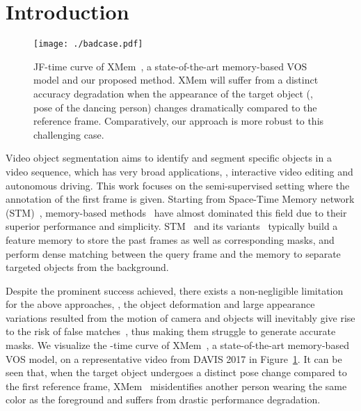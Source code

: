 \documentclass[10pt,twocolumn,letterpaper]{article}
\begin{document}
\section{Introduction}
\label{sec:intro}
\begin{figure}[t]
  \centering
   \texttt{[image: ./badcase.pdf]}
   \vspace{-0.15in}
   \caption{JF-time curve of XMem~\cite{cheng2022xmem}, a state-of-the-art memory-based VOS model and our proposed method. XMem will suffer from a distinct accuracy degradation when the appearance of the target object (\eg, pose of the dancing person) changes dramatically compared to the reference frame. Comparatively, our approach is more robust to this challenging case.}
   \label{fig:badcase}
\end{figure}

Video object segmentation aims to identify and segment specific objects in a video sequence, which has very broad applications, \eg, interactive video editing and autonomous driving. This work focuses on the semi-supervised setting where the annotation of the first frame is given. Starting from Space-Time Memory network (STM)~\cite{oh2019video}, memory-based methods~\cite{liang2020video,lu2020video,cheng2021mivos,hu2021learning,seong2021hierarchical,cheng2021stcn,wang2021swiftnet,park2022per,cheng2022xmem} have almost dominated this field due to their superior performance and simplicity. STM~\cite{oh2019video} and its variants~\cite{li2020fast,xie2021efficient,hu2021learning} typically build a feature memory to store the past frames as well as corresponding masks, and perform dense matching between the query frame and the memory to separate targeted objects from the background.

Despite the prominent success achieved, there exists a non-negligible limitation for the above approaches, \ie, the object deformation and large appearance variations resulted from the motion of camera and objects will inevitably give rise to the risk of false matches~\cite{oh2019video,cheng2021stcn,cheng2022xmem}, thus making them struggle to generate accurate masks. We visualize the -time curve of XMem~\cite{cheng2022xmem}, a state-of-the-art memory-based VOS model, on a representative video from DAVIS 2017 in Figure~\ref{fig:badcase}. It can be seen that, when the target object undergoes a distinct pose change compared to the first reference frame, XMem~\cite{cheng2022xmem} misidentifies another person wearing the same color as the foreground and suffers from drastic performance degradation. 
\end{document}
